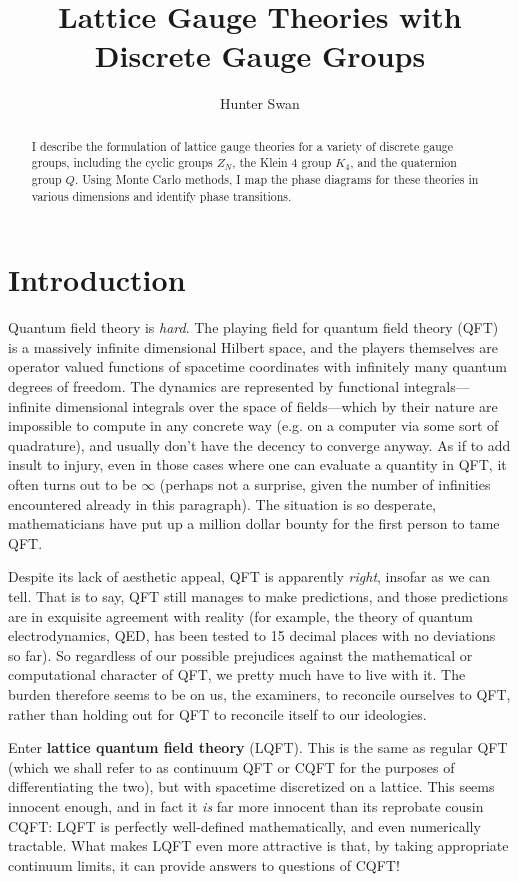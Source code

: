 \documentclass[9pt,twocolumn,twoside]{article}
\begin{document}
\title{Lattice Gauge Theories with Discrete Gauge Groups}
\author{Hunter Swan}

\maketitle
\begin{abstract}
I describe the formulation of lattice gauge theories for a variety of discrete gauge groups, including the cyclic groups $Z_N$, the Klein 4 group $K_4$, and the quaternion group $Q$.  Using Monte Carlo methods, I map the phase diagrams for these theories in various dimensions and identify phase transitions.
\end{abstract}

\section{Introduction}
Quantum field theory is \textit{hard}.  The playing field for quantum field theory (QFT) is a massively infinite dimensional Hilbert space, and the players themselves are operator valued functions of spacetime coordinates with infinitely many quantum degrees of freedom.  The dynamics are represented by functional integrals---infinite dimensional integrals over the space of fields---which by their nature are impossible to compute in any concrete way (e.g. on a computer via some sort of quadrature), and usually don't have the decency to converge anyway.  As if to add insult to injury, even in those cases where one can evaluate a quantity in QFT, it often turns out to be $\infty$ (perhaps not a surprise, given the number of infinities encountered already in this paragraph).  The situation is so desperate, mathematicians have put up a million dollar bounty for the first person to tame QFT.

Despite its lack of aesthetic appeal, QFT is apparently \textit{right}, insofar as we can tell.  That is to say, QFT still manages to make predictions, and those predictions are in exquisite agreement with reality (for example, the theory of quantum electrodynamics, QED, has been tested to 15 decimal places with no deviations so far).  So regardless of our possible prejudices against the mathematical or computational character of QFT, we pretty much have to live with it.  The burden therefore seems to be on us, the examiners, to reconcile ourselves to QFT, rather than holding out for QFT to reconcile itself to our ideologies.  

Enter \textbf{lattice quantum field theory} (LQFT).  This is the same as regular QFT (which we shall refer to as continuum QFT or CQFT for the purposes of differentiating the two), but with spacetime discretized on a lattice.  This seems innocent enough, and in fact it \textit{is} far more innocent than its reprobate cousin CQFT: LQFT is perfectly well-defined mathematically, and even numerically tractable.  What makes LQFT even more attractive is that, by taking appropriate continuum limits, it can provide answers to questions of CQFT!
\end{document}
